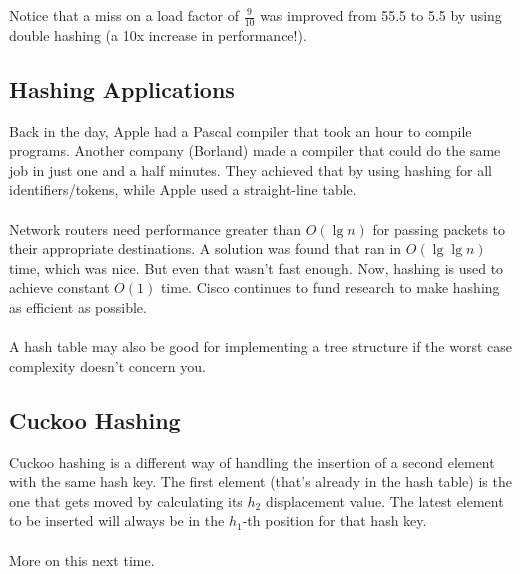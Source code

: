 \documentclass[]{article}
\theoremstyle{definition}
\begin{document}
				Notice that a miss on a load factor of $\frac{9}{10}$ was improved from 55.5 to 5.5 by using double hashing (a 10x increase in performance!).

		\subsection{Hashing Applications}
        Back in the day, Apple had a Pascal compiler that took an hour to compile programs. Another company (Borland) made a compiler that could do the same job in just one and a half minutes. They achieved that by using hashing for all identifiers/tokens, while Apple used a straight-line table.
			\\ \\
			Network routers need performance greater than $O(\lg n)$ for passing packets to their appropriate destinations. A solution was found that ran in $O(\lg \lg n)$ time, which was nice. But even that wasn't fast enough. Now, hashing is used to achieve constant $O(1)$ time. Cisco continues to fund research to make hashing as efficient as possible.
			\\ \\
			A hash table may also be good for implementing a tree structure if the worst case complexity doesn't concern you.
		
		\subsection{Cuckoo Hashing}
			Cuckoo hashing is a different way of handling the insertion of a second element with the same hash key. The first element (that's already in the hash table) is the one that gets moved by calculating its $h_2$ displacement value. The latest element to be inserted will always be in the $h_1$-th position for that hash key.
			\\ \\
			More on this next time.
\end{document}
